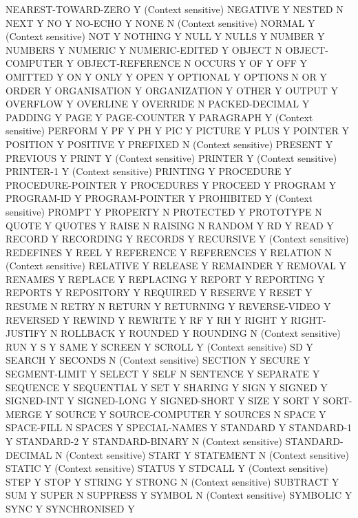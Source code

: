 NEAREST-TOWARD-ZERO		Y (Context sensitive)
NEGATIVE			Y
NESTED				N
NEXT				Y
NO				Y
NO-ECHO				Y
NONE				N (Context sensitive)
NORMAL				Y (Context sensitive)
NOT				Y
NOTHING				Y
NULL				Y
NULLS				Y
NUMBER				Y
NUMBERS				Y
NUMERIC				Y
NUMERIC-EDITED			Y
OBJECT				N
OBJECT-COMPUTER			Y
OBJECT-REFERENCE		N
OCCURS				Y
OF				Y
OFF				Y
OMITTED				Y
ON				Y
ONLY				Y
OPEN				Y
OPTIONAL			Y
OPTIONS				N
OR				Y
ORDER				Y
ORGANISATION			Y
ORGANIZATION			Y
OTHER				Y
OUTPUT				Y
OVERFLOW			Y
OVERLINE			Y
OVERRIDE			N
PACKED-DECIMAL			Y
PADDING				Y
PAGE				Y
PAGE-COUNTER			Y
PARAGRAPH			Y (Context sensitive)
PERFORM				Y
PF				Y
PH				Y
PIC				Y
PICTURE				Y
PLUS				Y
POINTER				Y
POSITION			Y
POSITIVE			Y
PREFIXED			N (Context sensitive)
PRESENT				Y
PREVIOUS			Y
PRINT				Y (Context sensitive)
PRINTER				Y (Context sensitive)
PRINTER-1			Y (Context sensitive)
PRINTING			Y
PROCEDURE			Y
PROCEDURE-POINTER		Y
PROCEDURES			Y
PROCEED				Y
PROGRAM				Y
PROGRAM-ID			Y
PROGRAM-POINTER			Y
PROHIBITED			Y (Context sensitive)
PROMPT				Y
PROPERTY			N
PROTECTED			Y
PROTOTYPE			N
QUOTE				Y
QUOTES				Y
RAISE				N
RAISING				N
RANDOM				Y
RD				Y
READ				Y
RECORD				Y
RECORDING			Y
RECORDS				Y
RECURSIVE			Y (Context sensitive)
REDEFINES			Y
REEL				Y
REFERENCE			Y
REFERENCES			Y
RELATION			N (Context sensitive)
RELATIVE			Y
RELEASE				Y
REMAINDER			Y
REMOVAL				Y
RENAMES				Y
REPLACE				Y
REPLACING			Y
REPORT				Y
REPORTING			Y
REPORTS				Y
REPOSITORY			Y
REQUIRED			Y
RESERVE				Y
RESET				Y
RESUME				N
RETRY				N
RETURN				Y
RETURNING			Y
REVERSE-VIDEO			Y
REVERSED			Y
REWIND				Y
REWRITE				Y
RF				Y
RH				Y
RIGHT				Y
RIGHT-JUSTIFY			N
ROLLBACK			Y
ROUNDED				Y
ROUNDING			N (Context sensitive)
RUN				Y
S				Y
SAME				Y
SCREEN				Y
SCROLL				Y (Context sensitive)
SD				Y
SEARCH				Y
SECONDS				N (Context sensitive)
SECTION				Y
SECURE				Y
SEGMENT-LIMIT			Y
SELECT				Y
SELF				N
SENTENCE			Y
SEPARATE			Y
SEQUENCE			Y
SEQUENTIAL			Y
SET				Y
SHARING				Y
SIGN				Y
SIGNED				Y
SIGNED-INT			Y
SIGNED-LONG			Y
SIGNED-SHORT			Y
SIZE				Y
SORT				Y
SORT-MERGE			Y
SOURCE				Y
SOURCE-COMPUTER			Y
SOURCES				N
SPACE				Y
SPACE-FILL			N
SPACES				Y
SPECIAL-NAMES			Y
STANDARD			Y
STANDARD-1			Y
STANDARD-2			Y
STANDARD-BINARY			N (Context sensitive)
STANDARD-DECIMAL		N (Context sensitive)
START				Y
STATEMENT			N (Context sensitive)
STATIC				Y (Context sensitive)
STATUS				Y
STDCALL				Y (Context sensitive)
STEP				Y
STOP				Y
STRING				Y
STRONG				N (Context sensitive)
SUBTRACT			Y
SUM				Y
SUPER				N
SUPPRESS			Y
SYMBOL				N (Context sensitive)
SYMBOLIC			Y
SYNC				Y
SYNCHRONISED			Y
